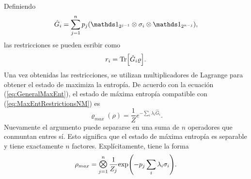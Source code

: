 Definiendo
\begin{equation}\label{eq:Ghat}
    \hat{G}_{i}=\sum_{j=1}^{n}p_{j}(\Id_{2^{j-1}}\otimes\sigma_{i}\otimes\Id_{2^{n-j}}),
\end{equation}
las restricciones se pueden esribir como
\begin{equation}\label{eq:MaxEntRestrictionsNM}
    r_{i}=\Tr[\hat{G}_{i}\varrho].
\end{equation}
Una vez obtenidas las restricciones, se utilizan multiplicadores de Lagrange para obtener el estado de maximiza la entropía. De acuerdo con la ecuación (\ref{eq:GeneralMaxEnt}), el estado de máxima entropía compatible con (\ref{eq:MaxEntRestrictionsNM}) es
\begin{equation}\label{eq:MaxEntLagMult}
    \varrho_{max}(\rho)=\frac{1}{Z}e^{-\sum_{i}\lambda_{i}\hat{G}_{i}}.
\end{equation}
Nuevamente el argumento puede separarse en una suma de $n$ operadores que conmuntan entres sí. Esto significa que el estado de máxima entropía es separable y tiene exactamente $n$ factores. Explícitamente, tiene la forma
\begin{equation}
    \rho_{max}=\Motimes_{j=1}^{n}\frac{1}{Z_{j}}\text{exp}\qty(-p_{j}\sum_{i}\lambda_{i}\sigma_{i}).
\end{equation}


